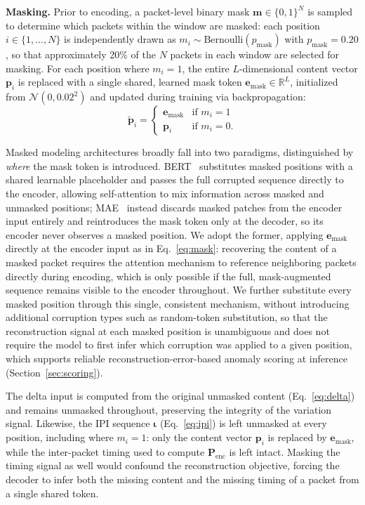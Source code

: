 \noindent\textbf{Masking.}
Prior to encoding, a packet-level binary mask $\mathbf{m} \in \{0, 1\}^{N}$ is sampled to 
determine which packets within the window are masked: each position $i \in \{1, \ldots, N\}$ 
is independently drawn as $m_i \sim \text{Bernoulli}(p_{\text{mask}})$ with $p_{\text{mask}} 
= 0.20$, so that approximately 20\% of the $N$ packets in each window are selected for 
masking. For each position where $m_i = 1$, the entire $L$-dimensional content vector 
$\mathbf{p}_i$ is replaced with a single shared, learned mask token $\mathbf{e}_{\text{mask}} 
\in \mathbb{R}^{L}$, initialized from $\mathcal{N}(0, 0.02^2)$ and updated during training 
via backpropagation:
\begin{equation}
    \tilde{\mathbf{p}}_i =
    \begin{cases}
        \mathbf{e}_{\text{mask}} & \text{if } m_i = 1 \\
        \mathbf{p}_i             & \text{if } m_i = 0.
    \end{cases}
    \label{eq:mask}
\end{equation}

Masked modeling architectures broadly fall into two paradigms, distinguished by \emph{where} 
the mask token is introduced. BERT~\cite{devlin2019bert} substitutes masked positions with a 
shared learnable placeholder and passes the full corrupted sequence directly to the encoder, 
allowing self-attention to mix information across masked and unmasked positions; MAE~\cite{he2022masked} instead discards masked patches from the encoder input entirely and 
reintroduces the mask token only at the decoder, so its encoder never observes a masked 
position. We adopt the former, applying $\mathbf{e}_{\text{mask}}$ directly at the encoder 
input as in Eq.~\eqref{eq:mask}: recovering the content of a masked packet requires the 
attention mechanism to reference neighboring packets directly during encoding, which is only 
possible if the full, mask-augmented sequence remains visible to the encoder throughout. We 
further substitute every masked position through this single, consistent mechanism, without 
introducing additional corruption types such as random-token substitution, so that the 
reconstruction signal at each masked position is unambiguous and does not require the model 
to first infer which corruption was applied to a given position, which supports reliable 
reconstruction-error-based anomaly scoring at inference (Section~\ref{sec:scoring}).

The delta input is computed from the original unmasked content (Eq.~\eqref{eq:delta}) and
remains unmasked throughout, preserving the integrity of the variation signal. Likewise, the
IPI sequence $\boldsymbol{\iota}$ (Eq.~\eqref{eq:ipi}) is left unmasked at every position,
including where $m_i = 1$: only the content vector $\mathbf{p}_i$ is replaced by 
$\mathbf{e}_{\text{mask}}$, while the inter-packet timing used to compute 
$\mathbf{P}_{\text{enc}}$ is left intact. Masking the timing signal as well would confound the 
reconstruction objective, forcing the decoder to infer both the missing content and the 
missing timing of a packet from a single shared token.

